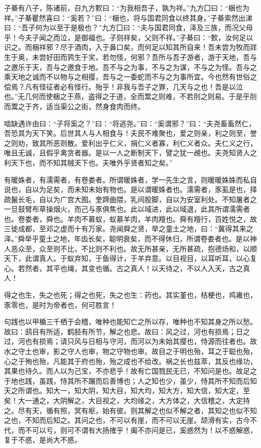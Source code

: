\documentclass[a4paper,12pt,UTF8,twoside]{ctexbook}
\begin{document}
子綦有八子，陈诸前，召九方歅曰：“为我相吾子，孰为祥。”九方囗曰：“梱也为祥。”子綦瞿然喜曰：“奚若？”曰：“梱也，将与国君同食以终其身。”子綦索然出涕曰：“吾子何为以至于是极也？”九方囗曰：“夫与国君同食，泽及三族，而况父母乎！今夫子闻之而泣，是御福也。子则祥矣，父则不祥。”子綦曰：“歅，汝何足以识之。而梱祥邪？尽于酒肉，入于鼻口矣，而何足以知其所自来！吾未尝为牧而牂生于奥，未尝好田而鹑生于宎，若勿怪，何邪？吾所与吾子游者，游于天地，吾与之邀乐于天，吾与之邀食于地。吾不与之为事，不与之为谋，不与之为怪。吾与之乘天地之诚而不以物与之相撄，吾与之一委蛇而不与之为事所宜。今也然有世俗之偿焉？凡有怪征者必有怪行。殆乎！非我与吾子之罪，几天与之也！吾是以泣也。”无几何而使梱之于燕，盗得之于道，全而鬻之则难，不若刖之则易。于是乎刖而鬻之于齐，适当渠公之街，然身食肉而终。

啮缺遇许由曰：“子将奚之？”曰：“将逃尧。”曰：“奚谓邪？”曰：“夫尧畜畜然仁，吾恐其为天下笑。后世其人与人相食与！夫民不难聚也，爱之则亲，利之则至，誉之则劝，致其所恶则散。爱利出乎仁义，捐仁义者寡，利仁义者众。夫仁义之行，唯且无诚，且假乎禽贪者器。是以一人之断制天下，譬之犹一覕也。夫尧知贤人之利天下也，而不知其贼天下也。夫唯外乎贤者知之矣。”

有暖姝者，有濡需者，有卷娄者。所谓暖姝者，学一先生之言，则暖暖姝姝而私自说也，自以为足矣，而未知未始有物也。是以谓暖姝者也。濡需者，豕虱是也，择疏鬣长毛，自以为广宫大囿。奎蹄曲隈，乳间股脚，自以为安室利处。不知屠者之一旦鼓臂布草操烟火，而己与豕俱焦也。此以域进，此以域退，此其所谓濡需者也。卷娄者，舜也。羊肉不慕蚁，蚁慕羊肉，羊肉羶也。舜有羶行，百姓悦之，故三徙成都，至邓之虚而十有万家。尧闻舜之贤，举之童土之地，曰：“冀得其来之泽。”舜举乎童土之地，年齿长矣，聪明衰矣，而不得休归，所谓卷娄者也。是以神人恶众至，众至则不比，不比则不利也。故无所甚亲，无所甚疏，抱德炀和，以顺天下，此谓真人。于蚁弃知，于鱼得计，于羊弃意。以目视目，以耳听耳，以心复心。若然者，其平也绳，其变也循。古之真人！以天待之，不以人入天，古之真人！

得之也生，失之也死；得之也死，失之也生：药也。其实堇也，桔梗也，鸡雍也，豕零也，是时为帝者也，何可胜言！

句践也以甲楯三千栖于会稽，唯种也能知亡之所以存，唯种也不知其身之所以愁。故曰：鸱目有所适，鹤胫有所节，解之也悲。故曰：风之过，河也有损焉；日之过，河也有损焉；请只风与日相与守河，而河以为未始其撄也，恃源而往者也。故水之守土也审，影之守人也审，物之守物也审。故目之于明也殆，耳之于聪也殆，心之于殉也殆，凡能其于府也殆，殆之成也不给改。祸之长也兹萃，其反也缘功，其果也待久。而人以为己宝，不亦悲乎！故有亡国戮民无已，不知问是也。故足之于地也践，虽践，恃其所不蹍而后善博也；人之知也少，虽少，恃其所不知而后知天之所谓也。知大一，知大阴，知大目，知大均，知大方，知大信，知大定，至矣！大一通之，大阴解之，大目视之，大均缘之，大方体之，大信稽之，大定持之。尽有天，循有照，冥有枢，始有彼。则其解之也似不解之者，其知之也似不知之也，不知而后知之。其问之也，不可以有崖，而不可以无崖。颉滑有实，古今不代，而不可以亏，则可不谓有大扬搉乎！阖不亦问是已，奚惑然为！以不惑解惑，复于不惑，是尚大不惑。
\end{document}
